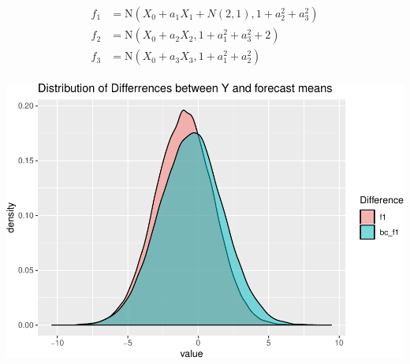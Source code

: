 \documentclass[]{article}
\begin{document}
\[
\begin{aligned}
f_1&=\text{N}(X_0+a_1X_1+N(2,1),1+a^2_2+a^2_3)\\
f_2&=\text{N}(X_0+a_2X_2,1+a^2_1+a^2_3+2)\\
f_3&=\text{N}(X_0+a_3X_3,1+a^2_1+a^2_2)\\
\end{aligned}
\]

\begin{center}\includegraphics[width=0.6\linewidth,height=0.6\textheight]{Newest_BLPsim_files/figure-latex/unnamed-chunk-15-1} \end{center}
\end{document}
